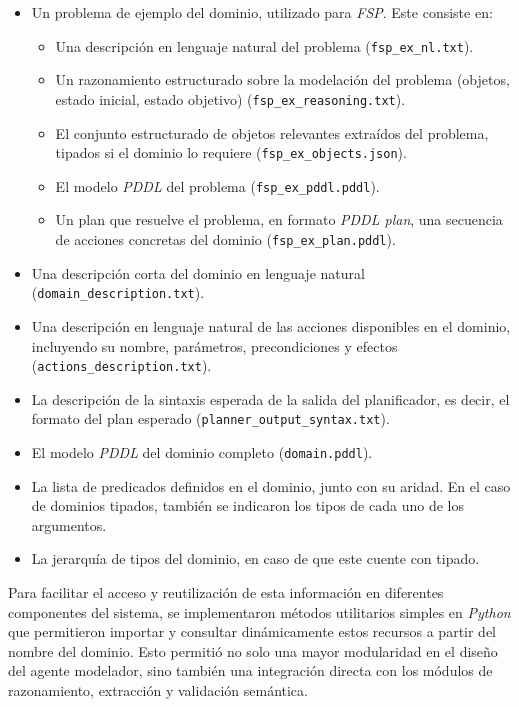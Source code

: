 \begin{itemize}
    \item Un problema de ejemplo del dominio, utilizado para \textit{FSP}. Este consiste en:
    \begin{itemize}
        \item Una descripción en lenguaje natural del problema (\texttt{fsp\_ex\_nl.txt}).
        \item Un razonamiento estructurado sobre la modelación del problema (objetos, estado inicial, estado objetivo) (\texttt{fsp\_ex\_reasoning.txt}).
        \item El conjunto estructurado de objetos relevantes extraídos del problema, tipados si el dominio lo requiere (\texttt{fsp\_ex\_objects.json}).
        \item El modelo \textit{PDDL} del problema (\texttt{fsp\_ex\_pddl.pddl}).
        \item Un plan que resuelve el problema, en formato \textit{PDDL plan}, una secuencia de acciones concretas del dominio (\texttt{fsp\_ex\_plan.pddl}).
    \end{itemize}
    \item Una descripción corta del dominio en lenguaje natural (\texttt{domain\_description.txt}).
    \item Una descripción en lenguaje natural de las acciones disponibles en el dominio, incluyendo su nombre, parámetros, precondiciones y efectos (\texttt{actions\_description.txt}).
    \item La descripción de la sintaxis esperada de la salida del planificador, es decir, el formato del plan esperado (\texttt{planner\_output\_syntax.txt}).
    \item El modelo \textit{PDDL} del dominio completo (\texttt{domain.pddl}).
    \item La lista de predicados definidos en el dominio, junto con su aridad. En el caso de dominios tipados, también se indicaron los tipos de cada uno de los argumentos.
    \item La jerarquía de tipos del dominio, en caso de que este cuente con tipado.
\end{itemize}

Para facilitar el acceso y reutilización de esta información en diferentes componentes del sistema, se implementaron métodos utilitarios simples en \textit{Python} que permitieron importar y consultar dinámicamente estos recursos a partir del nombre del dominio. Esto permitió no solo una mayor modularidad en el diseño del agente modelador, sino también una integración directa con los módulos de razonamiento, extracción y validación semántica.

